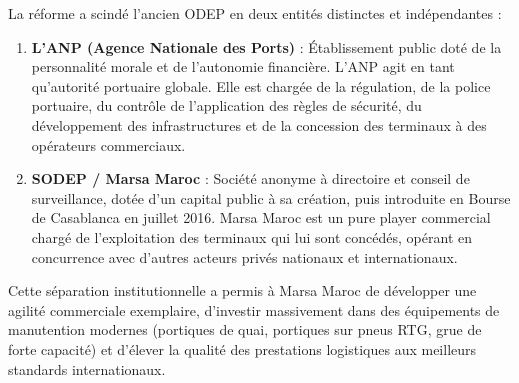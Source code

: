 \documentclass[12pt,a4paper,oneside]{report}
\begin{document}
La réforme a scindé l'ancien ODEP en deux entités distinctes et indépendantes :
\begin{enumerate}
    \item \textbf{L'ANP (Agence Nationale des Ports)} : Établissement public doté de la personnalité morale et de l'autonomie financière. L'ANP agit en tant qu'autorité portuaire globale. Elle est chargée de la régulation, de la police portuaire, du contrôle de l'application des règles de sécurité, du développement des infrastructures et de la concession des terminaux à des opérateurs commerciaux.
    \item \textbf{SODEP / Marsa Maroc} : Société anonyme à directoire et conseil de surveillance, dotée d'un capital public à sa création, puis introduite en Bourse de Casablanca en juillet 2016. Marsa Maroc est un pure player commercial chargé de l'exploitation des terminaux qui lui sont concédés, opérant en concurrence avec d'autres acteurs privés nationaux et internationaux.
\end{enumerate}

Cette séparation institutionnelle a permis à Marsa Maroc de développer une agilité commerciale exemplaire, d'investir massivement dans des équipements de manutention modernes (portiques de quai, portiques sur pneus RTG, grue de forte capacité) et d'élever la qualité des prestations logistiques aux meilleurs standards internationaux.
\end{document}
